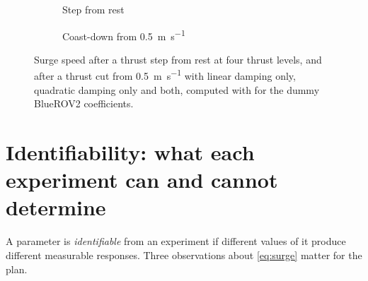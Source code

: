 \begin{figure}[htbp]
\centering
\begin{subfigure}{0.48\textwidth}
\centering
{}
\caption{Step from rest}
\end{subfigure}\hfill
\begin{subfigure}{0.48\textwidth}
\centering
{}
\caption{Coast-down from \qty{0.5}{\meter\per\second}}
\end{subfigure}
\caption{Surge speed after a thrust step from rest at four thrust levels, and after a thrust
cut from \qty{0.5}{\meter\per\second} with linear damping only, quadratic damping only and
both, computed with  for the dummy BlueROV2 coefficients.}
\label{fig:step}
\end{figure}
\FloatBarrier

\section{Identifiability: what each experiment can and cannot determine}
\label{sec:identifiability}

A parameter is \emph{identifiable} from an experiment if different values of it produce
different measurable responses. Three observations about \eqref{eq:surge} matter for the plan.

